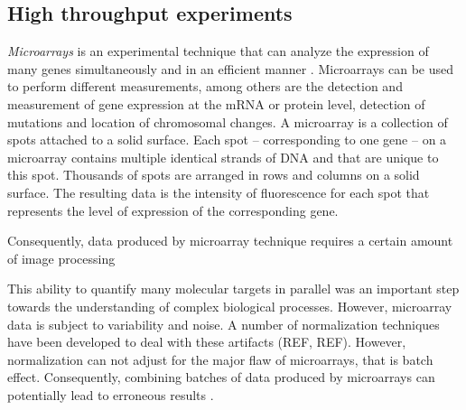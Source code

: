 \subsection{High throughput experiments}


\emph{Microarrays} is an experimental technique that can analyze the expression of many genes simultaneously and in an efficient manner \parencites{smyth2005use}{sealfon2011rna}. Microarrays can be used to perform different measurements, among others are the detection and measurement of gene expression at the mRNA or protein level, detection of  mutations and location of chromosomal changes. A microarray is a collection of spots attached to a solid surface. Each spot -- corresponding to one gene -- on a microarray contains multiple identical strands of DNA and that are unique to this spot. Thousands of spots are arranged in rows and columns on a solid surface. The resulting data is the intensity of fluorescence for each spot that represents the level of expression of the corresponding gene.

Consequently, data produced by microarray technique requires a certain amount of image processing 


	
This ability to quantify many molecular targets in parallel was an important step towards the understanding of complex biological processes. However, microarray data is subject to variability and noise. A number of normalization techniques have been developed to deal with these artifacts (REF, REF). However, normalization can not adjust for the major flaw of microarrays, that is batch effect. Consequently, combining batches of data produced by microarrays can potentially lead to erroneous results \parencite{johnson2007adjusting}.

